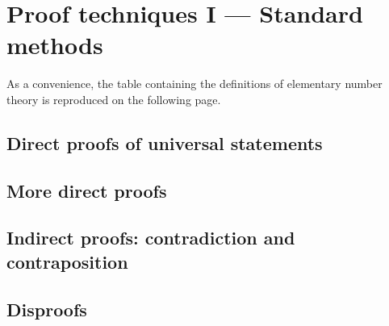 

\chapter[Proof techniques I]{Proof techniques I --- Standard methods}

As a convenience, the table containing the definitions of elementary number theory is reproduced on the following page.



\clearpage 

\section{Direct proofs of universal statements}









\newpage
\section{More direct proofs}





\newpage

\section[Contradiction and contraposition]{Indirect proofs: contradiction and contraposition}




\newpage

\section{Disproofs}





\newpage

